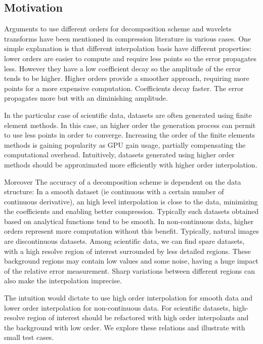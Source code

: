 \documentclass[conference]{IEEEtran}
\theoremstyle{remark}
\begin{document}
\subsection{Motivation}
Arguments to use different orders for decomposition scheme and wavelets transforms have been mentioned in compression literature in various cases.%
One simple explanation is that different interpolation basis have different properties:
lower orders are easier to compute and require less points so the error propagates less. However they have a low coefficient decay so the amplitude of the error tends to be higher.
Higher orders provide a smoother approach, requiring more points for a more expensive computation. Coefficients decay faster. The error propagates more but with an diminishing amplitude.

In the particular case of scientific data, datasets are often generated using finite element methods.
In this case, an higher order the generation process can permit to use less points in order to converge.
Increasing the order of the finite elements methods is gaining popularity as GPU gain usage, partially compensating the computational overhead.
Intuitively, datasets generated using higher order methods should be approximated more efficiently with higher order interpolation. 

Moreover The accuracy of a decomposition scheme is dependent on the data structure:
	In a smooth dataset (ie continuous with a certain number of continuous derivative),  an  high level interpolation is close to the data, minimizing the coefficients and enabling better compression. Typically such datasets obtained based on analytical functions tend to be smooth.
	In non-continuous data, higher orders represent more computation without this benefit. Typically, natural images are discontinuous datasets.
	Among scientific data, we can find spare datasets, with a high resolve region of interest surrounded by less detailed regions.
    These background regions may contain low values and some noise, having a huge impact of the relative error measurement. Sharp variations between different regions can also make the interpolation imprecise.

    
The intuition would dictate to use high order interpolation for smooth data and lower order interpolation for non-continuous data. For scientific datasets, high-resolve region of interest should be refactored with high order interpolants and the background with low order.
We explore these relations and illustrate with small test cases.
\end{document}

